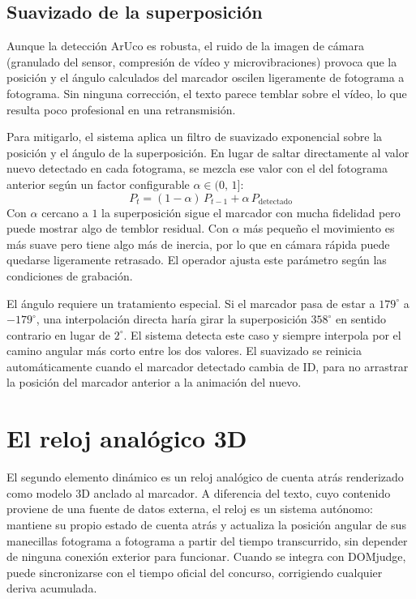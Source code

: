  
\subsection{Suavizado de la superposición}
\label{subsec:suavizado}
 
Aunque la detección ArUco es robusta, el ruido de la imagen de cámara (granulado del sensor,
compresión de vídeo y microvibraciones) provoca que la posición y el ángulo calculados del
marcador oscilen ligeramente de fotograma a fotograma. Sin ninguna corrección, el texto parece temblar
sobre el vídeo, lo que resulta poco profesional en una retransmisión.
 
Para mitigarlo, el sistema aplica un filtro de suavizado exponencial sobre la posición y el
ángulo de la superposición. En lugar de saltar directamente al valor nuevo detectado en cada fotograma, se
mezcla ese valor con el del fotograma anterior según un factor configurable $\alpha \in (0,\,1]$:
\[
  P_t = (1 - \alpha)\,P_{t-1} + \alpha\,P_{\text{detectado}}
\]
Con $\alpha$ cercano a $1$ la superposición sigue el marcador con mucha fidelidad pero puede mostrar
algo de temblor residual. Con $\alpha$ más pequeño el movimiento es más suave pero tiene algo
más de inercia, por lo que en cámara rápida puede quedarse ligeramente retrasado. El operador
ajusta este parámetro según las condiciones de grabación.
 
El ángulo requiere un tratamiento especial. Si el marcador pasa de estar a $179^\circ$ a
$-179^\circ$, una interpolación directa haría girar la superposición $358^\circ$ en sentido contrario
en lugar de $2^\circ$. El sistema detecta este caso y siempre interpola por el camino angular
más corto entre los dos valores. El suavizado se reinicia automáticamente cuando el marcador
detectado cambia de ID, para no arrastrar la posición del marcador anterior a la animación del
nuevo.


\section{El reloj analógico 3D}
\label{sec:reloj3d}
 
El segundo elemento dinámico es un reloj analógico de cuenta atrás renderizado como modelo 3D
anclado al marcador. A diferencia del texto, cuyo contenido proviene de una fuente de datos
externa, el reloj es un sistema autónomo: mantiene su propio estado de cuenta atrás y actualiza
la posición angular de sus manecillas fotograma a fotograma a partir del tiempo transcurrido,
sin depender de ninguna conexión exterior para funcionar. Cuando se integra con DOMjudge, puede
sincronizarse con el tiempo oficial del concurso, corrigiendo cualquier deriva acumulada.
 
